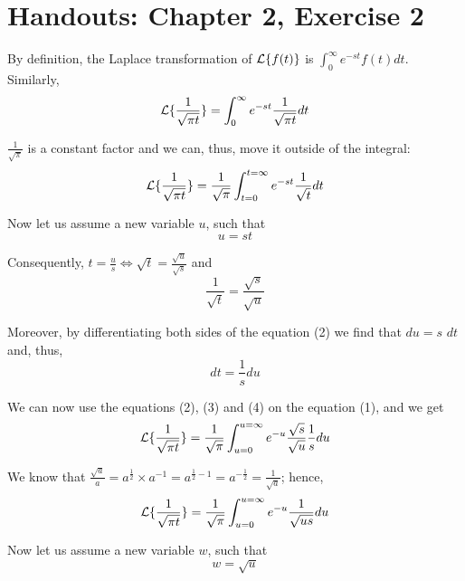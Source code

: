 \documentclass[notitlepage,12pt]{article}
\begin{document}
	
	\section*{Handouts: Chapter 2, Exercise 2}
	\setcounter{equation}{0}
	
	By definition, the Laplace transformation of $\mathcal{L} \{f(t)\} $ is $\int_{0}^{\infty} e^{-st} f(t) dt$. Similarly,
	\begin{equation*} \mathcal{L} \{ \frac{1}{\sqrt{\pi t}}\} =  \int_{0}^{\infty} e^{-st} \frac{1}{\sqrt{\pi t}} dt \end{equation*}
	
	$\frac{1}{\sqrt{\pi}}$ is a constant factor and we can, thus, move it outside of the integral:
	\begin{equation} 
	\mathcal{L} \{ \frac{1}{\sqrt{\pi t}}\} = \frac{1}{\sqrt{\pi}} \int_{t=0}^{t=\infty} e^{-st} \frac{1}{\sqrt{t}} dt 
	\end{equation}
	
	Now let us assume a new variable $u$, such that 
	\begin{equation}u = st \end{equation}
	
	Consequently, $t = \frac{u}{s} \Leftrightarrow \sqrt{t} = \frac{\sqrt{u}}{\sqrt{s}}$ and 
	\begin{equation}
	\frac{1}{\sqrt{t}} = \frac{\sqrt{s}}{\sqrt{u}}
	\end{equation}
	
	Moreover, by differentiating both sides of the equation (2) we find that $du = s$ $dt$ and, thus,
	\begin{equation}
	dt = \frac{1}{s}du
	\end{equation}
	
	We can now use the equations (2), (3) and (4) on the equation (1), and we get
	\begin{equation*} 
	\mathcal{L} \{ \frac{1}{\sqrt{\pi t}}\} = \frac{1}{\sqrt{\pi}} \int_{u=0}^{u=\infty} e^{-u} \frac{\sqrt{s}}{\sqrt{u}} \frac{1}{s}du 
	\end{equation*}
	
	We know that $\frac{\sqrt{a}}{a} = a^{\frac{1}{2}} \times a^{-1}  = a^{\frac{1}{2}-1} = a^{-\frac{1}{2}} = \frac{1}{\sqrt{a}}$; hence,
	\begin{equation} 
	\mathcal{L} \{ \frac{1}{\sqrt{\pi t}}\} = \frac{1}{\sqrt{\pi}} \int_{u=0}^{u=\infty} e^{-u} \frac{1}{\sqrt{us}}du 
	\end{equation}
	
	Now let us assume a new variable $w$, such that 
	\begin{equation}w = \sqrt{u} \end{equation}
	
\end{document}
